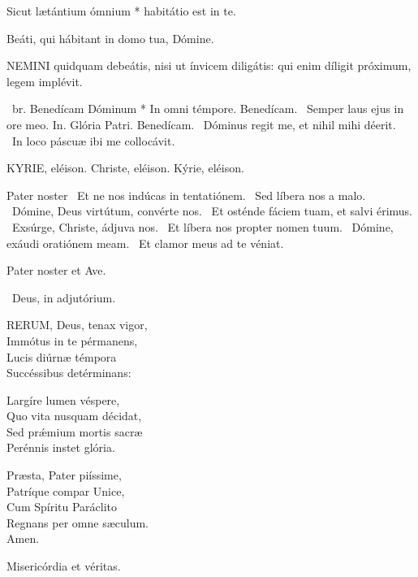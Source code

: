 Sicut lætántium ómnium * habitátio est in te.

 Beáti, qui hábitant in domo tua, Dómine.



\lettrine[lines=2]{N}{EMINI} quidquam debeátis, nisi ut ínvicem diligátis: qui enim díligit próximum, legem implévit.

\R\ br. Benedícam Dóminum * In omni témpore. Benedícam. \V\ Semper laus ejus in ore meo. In. Glória Patri. Benedícam. \V\ Dóminus regit me, et nihil mihi déerit. \R\ In loco páscuæ ibi me collocávit.



KYRIE, eléison. Christe, eléison. Kýrie, eléison.

Pater noster  \V\ Et ne nos indúcas in tentatiónem. \R\ Sed líbera nos a malo. \V\ Dómine, Deus virtútum, convérte nos. \R\ Et osténde fáciem tuam, et salvi érimus. \V\ Exsúrge, Christe, ádjuva nos. \R\ Et líbera nos propter nomen tuum. \V\ Dómine, exáudi oratiónem meam. \R\ Et clamor meus ad te véniat.



Pater noster et Ave.

\V\ Deus, in adjutórium.


\lettrine[lines=2]{R}{ERUM}, Deus, tenax vigor,\\
Immótus in te pérmanens,\\
Lucis diúrnæ témpora\\
Succéssibus detérminans:

Largíre lumen véspere,\\
Quo vita nusquam décidat,\\
Sed prǽmium mortis sacræ\\
Perénnis instet glória.

Præsta, Pater piíssime,\\
Patríque compar Unice,\\
Cum Spíritu Paráclito\\
Regnans per omne sæculum.\\
Amen.

 Misericórdia et véritas.

